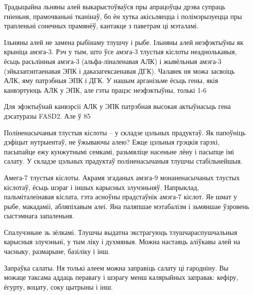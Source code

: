 Традыцыйна льняны алей выкарыстоўваўся пры апрацоўцы дрэва супраць гніеньня, прамочваньні тканінаў, бо ён хутка акісьляецца і полімэрызуецца пры трапленьні сонечных прамянёў, кантакце з паветрам ці мэталамі.

Ільняны алей не замена рыбінаму тлушчу і рыбе.
Ільняны алей неэфэктыўны як крыніца амэга-3. Рэч у тым, што ўсе амэга-3 тлустыя кіслоты неаднолькавыя, ёсьць расьлінныя амэга-3 (альфа-ліналенавая АЛК) і жывёльныя амэга-3 (эйказапэнтаенавая ЭПК і даказагексаенавая ДГК). Чалавек ня можа засвоіць АЛК, яму патрэбныя ЭПК і ДГК. У нашым арганізьме ёсьць гены, якія канвэртуюць АЛК у ЭПК, але гэты працэс неэфэктыўны, толькі 1-6%

Для эфэктыўнай канвэрсіі АЛК у ЭПК патрэбная высокая актыўнасьць гена дэсатуразы FASD2. Але ў 85%

Поліненасычаныя тлустыя кіслоты – у складзе цэльных прадуктаў.
Як папоўніць дэфіцыт нутрыентаў, не ўжываючы алею? Ежце цэльныя грэцкія гарэхі, пасыпайце ежу кунжутнымі семкамі, разьмяліце насеньне лёну і пасыпце імі салату. У складзе цэльных прадуктаў поліненасычаныя тлушчы стабільнейшыя.

Амега-7 тлустыя кіслоты.
Акрамя згаданых амэга-9 монаненасычаных тлустых кіслотаў, ёсьць шэраг і іншых карысных злучэньняў. Напрыклад, пальміталеінавая кіслата, гэта асноўны прадстаўнік амэга-7 кіслот. Яе шмат у рыбе, макадаміі, абляпіхавым алеі. Яна паляпшае мэтабалізм і зьмяншае ўзровень сыстэмнага запаленьня.

Спалучэньне зь зёлкамі.
Тлушчы выдатна экстрагуюць тлушчараспушчальныя карысныя злучэньні, у тым ліку і духмяныя. Можна настаяць аліўкавы алей на часныку, размарыне, базіліку і інш.

Запраўка салаты.
Ня толькі алеем можна заправіць салату ці гародніну. Вы можаце таксама аддаць перавагу і шэрагу менш калярыйных заправак: кефіру, ёгурту, воцату, соку цытрыны і інш.

